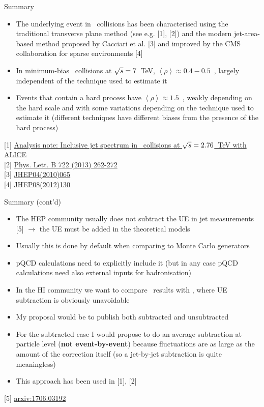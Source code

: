 \documentclass[xcolor={usenames,dvipsnames}]{beamer}
\begin{document}
\begin{frame}{Summary}
\begin{itemize}
\item The underlying event in \pp\ collisions has been characterised using the traditional transverse plane method (see e.g. [1], [2]) and the modern jet-area-based method proposed by Cacciari et al. [3] and improved by the CMS collaboration for sparse environments [4]
\item In minimum-bias \pp\ collisions at $\sqrt{s}=7$~TeV, $\left<\rho\right>\approx0.4-0.5$~\GeVc, largely independent of the technique used to estimate it
\item Events that contain a hard process have $\left<\rho\right>\approx1.5$~\GeVc, weakly depending on the hard scale and with some variations depending on the technique used to estimate it
(different techniques have different biases from the presence of the hard process)
\end{itemize}
{\tiny
{[1]} \href{https://aliceinfo.cern.ch/Notes/sites/aliceinfo.cern.ch.Notes/files/notes/analysis/rma/2013-Mar-29-analysis_note-ppJet_note.pdf}{Analysis note: Inclusive jet spectrum in \pp\ collisions at $\sqrt{s}=2.76$~TeV with ALICE} \\
{[2]} \href{https://doi.org/10.1016/j.physletb.2013.04.026}{Phys. Lett. B 722 (2013) 262-272} \\
{[3]} \href{https://doi.org/10.1007/JHEP04(2010)065}{JHEP04(2010)065}\\
{[4]} \href{https://doi.org/10.1007/JHEP08(2012)130}{JHEP08(2012)130}
}
\end{frame}

\begin{frame}{Summary (cont'd)}
\begin{itemize}
\item The HEP community usually does not subtract the UE in jet measurements [5] $\rightarrow$ the UE must be added in the theoretical models
\item Usually this is done by default when comparing to Monte Carlo generators
\item pQCD calculations need to explicitly include it (but in any case pQCD calculations need also external inputs for hadronisation)
\item In the HI community we want to compare \pp\ results with \PbPb, where UE subtraction is obviously unavoidable
\item My proposal would be to publish both subtracted and unsubtracted
\item For the subtracted case I would propose to do an average subtraction at particle level (\textbf{not event-by-event}) 
because fluctuations are as large as the amount of the correction itself (so a jet-by-jet subtraction is quite meaningless)
\item This approach has been used in [1], [2]
\end{itemize}
{\tiny
{[5]} \href{https://arxiv.org/abs/1706.03192}{arxiv:1706.03192} \\
}
\end{frame}
\end{document}
